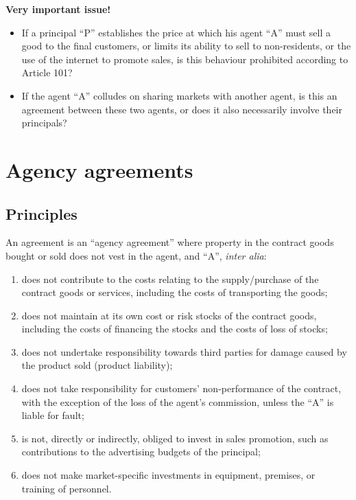         \textbf{Very important issue!}
        \begin{itemize}
            \item If a principal ``P'' establishes the price at which his agent ``A'' must sell a good to the final customers, or limits its ability to sell to non-residents, or the use of the internet to promote sales, is this behaviour prohibited according to Article 101?
            \item If the agent ``A'' colludes on sharing markets with another agent, is this an agreement between these two agents, or does it also necessarily involve their principals?
        \end{itemize} 

\section{Agency agreements}

    \subsection{Principles}

        An agreement is an ``agency agreement'' where property in the contract goods bought or sold does not vest in the agent, and ``A'', \textit{inter alia}:
        \begin{enumerate}
            \item does not contribute to the costs relating to the supply/purchase of the contract goods or services, including the costs of transporting the goods;
            \item does not maintain at its own cost or risk stocks of the contract goods, including the costs of financing the stocks and the costs of loss of stocks;
            \item does not undertake responsibility towards third parties for damage caused by the product sold (product liability);
            \item does not take responsibility for customers' non-performance of the contract, with the exception of the loss of the agent's commission, unless the ``A'' is liable for fault;
            \item is not, directly or indirectly, obliged to invest in sales promotion, such as contributions to the advertising budgets of the principal;
            \item does not make market-specific investments in equipment, premises, or training of personnel.
        \end{enumerate}


